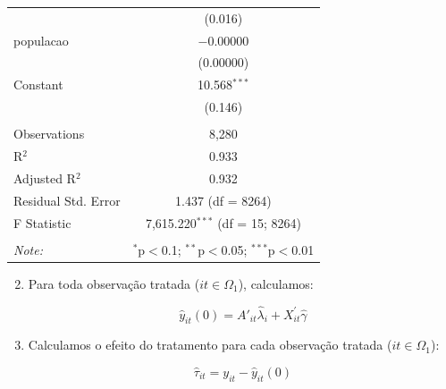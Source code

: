 \documentclass[portugues]{article}
\newenvironment{Shaded}{\begin{snugshade}}{\end{snugshade}}
\newcommand{\CommentTok}[1]{\textcolor[rgb]{0.56,0.35,0.01}{\textit{#1}}}
\newcommand{\FunctionTok}[1]{\textcolor[rgb]{0.13,0.29,0.53}{\textbf{#1}}}
\newcommand{\NormalTok}[1]{#1}
\newcommand{\OtherTok}[1]{\textcolor[rgb]{0.56,0.35,0.01}{#1}}
\newcommand{\SpecialCharTok}[1]{\textcolor[rgb]{0.81,0.36,0.00}{\textbf{#1}}}
\begin{document}
\begin{box_code}
\begin{center}
\begin{tabular}{@{\extracolsep{5pt}}lc}
      & (0.016) \\ 
     populacao & $-$0.00000 \\ 
      & (0.00000) \\ 
     Constant & 10.568$^{***}$ \\ 
      & (0.146) \\ 
    \hline \\[-1.8ex] 
    Observations & 8,280 \\ 
    R$^{2}$ & 0.933 \\ 
    Adjusted R$^{2}$ & 0.932 \\ 
    Residual Std. Error & 1.437 (df = 8264) \\ 
    F Statistic & 7,615.220$^{***}$ (df = 15; 8264) \\ 
    \hline 
    \hline \\[-1.8ex] 
    \textit{Note:}  & \multicolumn{1}{r}{$^{*}$p$<$0.1; $^{**}$p$<$0.05; $^{***}$p$<$0.01} \\ 
    \end{tabular} 
    \end{center}
 \endgroup

\end{box_code}

\begin{enumerate}
    \setcounter{enumi}{1}
   \item Para toda observação tratada ($it \in \Omega_1$), calculamos:

    $$\hat{y}_{it}(0) = A'_{it} \hat{\lambda}_i + X^\prime_{it} \hat{\gamma}$$
\end{enumerate}

\begin{box_code}

\begin{Shaded}
\end{Shaded}

\end{box_code}

\begin{enumerate}
    \setcounter{enumi}{2}
     \item Calculamos o efeito do tratamento para cada observação tratada ($it \in \Omega_1$):

    $$ \hat{\tau}_{it} = y_{it} - \hat{y}_{it}(0)  $$ 
\end{enumerate}
\end{document}
